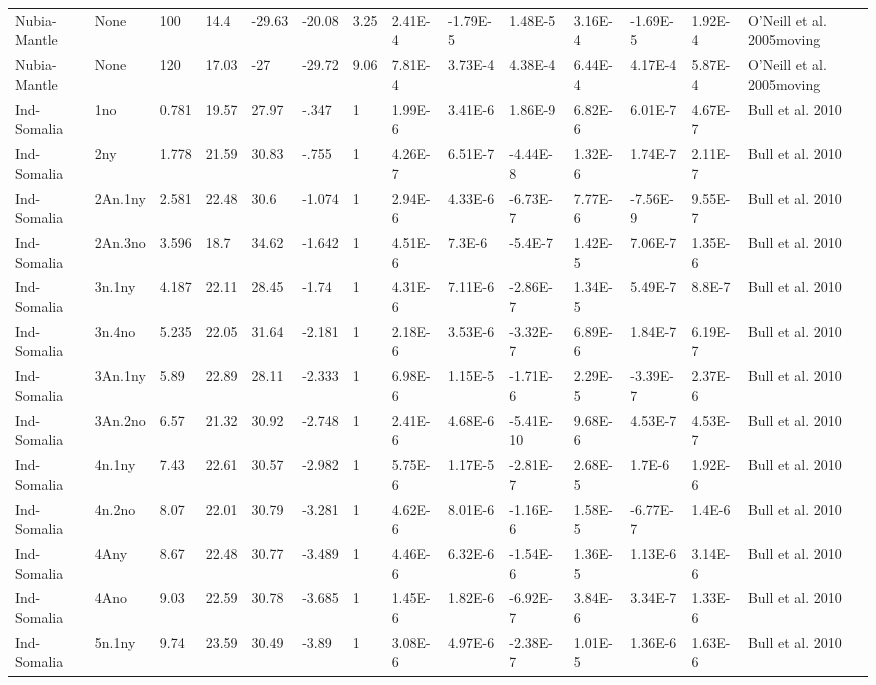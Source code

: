 \begin{landscape}
\begin{longtable}{@{}lllllllllllllp{3.5cm}@{}}
Nubia-Mantle & None & 100 & 14.4 & -29.63 & -20.08 & 3.25 & 2.41E-4 & -1.79E-5 & 1.48E-5 & 3.16E-4 & -1.69E-5 & 1.92E-4 & O'Neill et al. 2005moving \\
Nubia-Mantle & None & 120 & 17.03 & -27 & -29.72 & 9.06 & 7.81E-4 & 3.73E-4 & 4.38E-4 & 6.44E-4 & 4.17E-4 & 5.87E-4 & O'Neill et al. 2005moving \\
Ind-Somalia & 1no & 0.781 & 19.57 & 27.97 & -.347 & 1 & 1.99E-6 & 3.41E-6 & 1.86E-9 & 6.82E-6 & 6.01E-7 & 4.67E-7 & Bull et al. 2010 \\
Ind-Somalia & 2ny & 1.778 & 21.59 & 30.83 & -.755 & 1 & 4.26E-7 & 6.51E-7 & -4.44E-8 & 1.32E-6 & 1.74E-7 & 2.11E-7 & Bull et al. 2010 \\
Ind-Somalia & 2An.1ny & 2.581 & 22.48 & 30.6 & -1.074 & 1 & 2.94E-6 & 4.33E-6 & -6.73E-7 & 7.77E-6 & -7.56E-9 & 9.55E-7 & Bull et al. 2010 \\
Ind-Somalia & 2An.3no & 3.596 & 18.7 & 34.62 & -1.642 & 1 & 4.51E-6 & 7.3E-6 & -5.4E-7 & 1.42E-5 & 7.06E-7 & 1.35E-6 & Bull et al. 2010 \\
Ind-Somalia & 3n.1ny & 4.187 & 22.11 & 28.45 & -1.74 & 1 & 4.31E-6 & 7.11E-6 & -2.86E-7 & 1.34E-5 & 5.49E-7 & 8.8E-7 & Bull et al. 2010 \\
Ind-Somalia & 3n.4no & 5.235 & 22.05 & 31.64 & -2.181 & 1 & 2.18E-6 & 3.53E-6 & -3.32E-7 & 6.89E-6 & 1.84E-7 & 6.19E-7 & Bull et al. 2010 \\
Ind-Somalia & 3An.1ny & 5.89 & 22.89 & 28.11 & -2.333 & 1 & 6.98E-6 & 1.15E-5 & -1.71E-6 & 2.29E-5 & -3.39E-7 & 2.37E-6 & Bull et al. 2010 \\
Ind-Somalia & 3An.2no & 6.57 & 21.32 & 30.92 & -2.748 & 1 & 2.41E-6 & 4.68E-6 & -5.41E-10 & 9.68E-6 & 4.53E-7 & 4.53E-7 & Bull et al. 2010 \\
Ind-Somalia & 4n.1ny & 7.43 & 22.61 & 30.57 & -2.982 & 1 & 5.75E-6 & 1.17E-5 & -2.81E-7 & 2.68E-5 & 1.7E-6 & 1.92E-6 & Bull et al. 2010 \\
Ind-Somalia & 4n.2no & 8.07 & 22.01 & 30.79 & -3.281 & 1 & 4.62E-6 & 8.01E-6 & -1.16E-6 & 1.58E-5 & -6.77E-7 & 1.4E-6 & Bull et al. 2010 \\
Ind-Somalia & 4Any & 8.67 & 22.48 & 30.77 & -3.489 & 1 & 4.46E-6 & 6.32E-6 & -1.54E-6 & 1.36E-5 & 1.13E-6 & 3.14E-6 & Bull et al. 2010 \\
Ind-Somalia & 4Ano & 9.03 & 22.59 & 30.78 & -3.685 & 1 & 1.45E-6 & 1.82E-6 & -6.92E-7 & 3.84E-6 & 3.34E-7 & 1.33E-6 & Bull et al. 2010 \\
Ind-Somalia & 5n.1ny & 9.74 & 23.59 & 30.49 & -3.89 & 1 & 3.08E-6 & 4.97E-6 & -2.38E-7 & 1.01E-5 & 1.36E-6 & 1.63E-6 & Bull et al. 2010 \\

\end{longtable}
\end{landscape}
